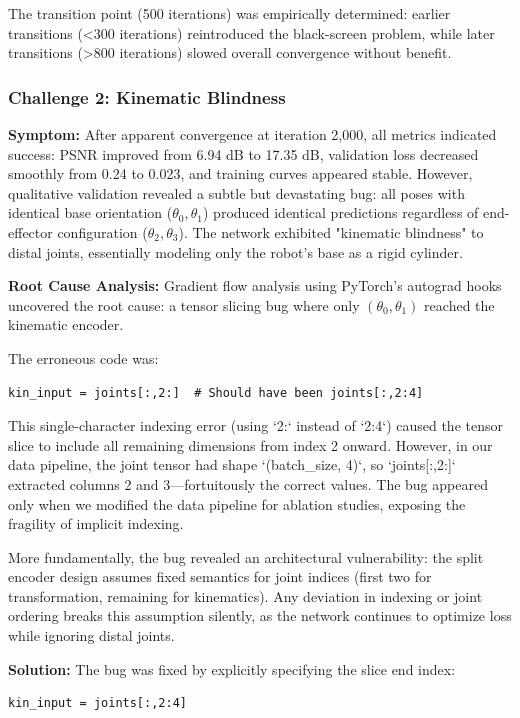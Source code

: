 \documentclass[12pt,a4paper,oneside]{report}
\begin{document}
The transition point (500 iterations) was empirically determined: earlier transitions (<300 iterations) reintroduced the black-screen problem, while later transitions (>800 iterations) slowed overall convergence without benefit.

\subsubsection{Challenge 2: Kinematic Blindness}

\textbf{Symptom:} After apparent convergence at iteration 2,000, all metrics indicated success: PSNR improved from 6.94 dB to 17.35 dB, validation loss decreased smoothly from 0.24 to 0.023, and training curves appeared stable. However, qualitative validation revealed a subtle but devastating bug: all poses with identical base orientation ($\theta_0, \theta_1$) produced identical predictions regardless of end-effector configuration ($\theta_2, \theta_3$). The network exhibited "kinematic blindness" to distal joints, essentially modeling only the robot's base as a rigid cylinder.

\textbf{Root Cause Analysis:} Gradient flow analysis using PyTorch's autograd hooks uncovered the root cause: a tensor slicing bug where only $(\theta_0, \theta_1)$ reached the kinematic encoder.

The erroneous code was:
\begin{verbatim}
kin_input = joints[:,2:]  # Should have been joints[:,2:4]
\end{verbatim}

This single-character indexing error (using `2:` instead of `2:4`) caused the tensor slice to include all remaining dimensions from index 2 onward. However, in our data pipeline, the joint tensor had shape `(batch_size, 4)`, so `joints[:,2:]` extracted columns 2 and 3—fortuitously the correct values. The bug appeared only when we modified the data pipeline for ablation studies, exposing the fragility of implicit indexing.

More fundamentally, the bug revealed an architectural vulnerability: the split encoder design assumes fixed semantics for joint indices (first two for transformation, remaining for kinematics). Any deviation in indexing or joint ordering breaks this assumption silently, as the network continues to optimize loss while ignoring distal joints.

\textbf{Solution:} The bug was fixed by explicitly specifying the slice end index:
\begin{verbatim}
kin_input = joints[:,2:4]
\end{verbatim}
\end{document}
